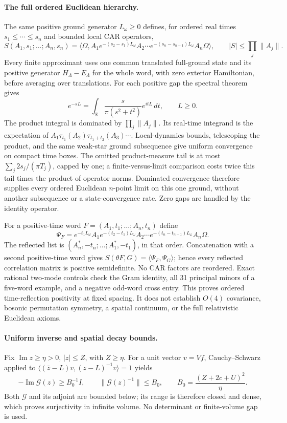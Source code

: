 \paragraph{The full ordered Euclidean hierarchy.}
The same positive ground generator $L_\omega\geq0$ defines, for ordered
real times $s_1\leq\cdots\leq s_n$ and bounded local CAR operators,
\[
 S(A_1,s_1;\ldots;A_n,s_n)
 =\langle\Omega,A_1e^{-(s_2-s_1)L_\omega}A_2\cdots
                   e^{-(s_n-s_{n-1})L_\omega}A_n\Omega\rangle,
 \qquad |S|\leq\prod_j\|A_j\|.
\]
Every finite approximant uses one common translated full-ground state
and its positive generator $H_\Lambda-E_\Lambda$ for the whole word,
with zero exterior Hamiltonian, before averaging over translations.
For each positive gap the spectral theorem gives
\[
 e^{-sL}=\int_{\mathbb R}\frac{s}{\pi(s^2+t^2)}e^{itL}\,dt,
 \qquad L\geq0.
\]
The product integral is dominated by $\prod_j\|A_j\|$.
Its real-time integrand is the expectation of
$A_1\tau_{t_1}(A_2)\tau_{t_1+t_2}(A_3)\cdots$.
Local-dynamics bounds, telescoping the product, and the same
weak-star ground subsequence give uniform convergence on compact time
boxes.  The omitted product-measure tail is at most
$\sum_j2s_j/(\pi T_j)$, capped by one; a finite-versus-limit comparison
costs twice this tail times the product of operator norms.  Dominated
convergence therefore supplies every ordered Euclidean $n$-point limit
on this one ground, without another subsequence or a state-convergence rate.
Zero gaps are handled by the identity operator.

For a positive-time word $F=(A_1,t_1;\ldots;A_n,t_n)$ define
\[
 \Psi_F=e^{-t_1L_\omega}A_1e^{-(t_2-t_1)L_\omega}A_2\cdots
                      e^{-(t_n-t_{n-1})L_\omega}A_n\Omega.
\]
The reflected list is
$(A_n^*,-t_n;\ldots;A_1^*,-t_1)$, in that order.
Concatenation with a second positive-time word gives
$S(\theta F,G)=\langle\Psi_F,\Psi_G\rangle$; hence every reflected
correlation matrix is positive semidefinite.  No CAR factors are
reordered.  Exact rational two-mode controls check the Gram identity,
all 31 principal minors of a five-word example, and a negative odd-word
cross entry.  This proves ordered time-reflection positivity at fixed
spacing.  It does not establish $O(4)$ covariance, bosonic permutation
symmetry, a spatial continuum, or the full relativistic Euclidean axioms.

\paragraph{Uniform inverse and spatial decay bounds.}
Fix $\operatorname{Im}z\geq\eta>0$, $|z|\leq Z$, with $Z\geq\eta$.
For a unit vector $v=Vf$, Cauchy--Schwarz applied to
$\langle(\bar z-L)v,(z-L)^{-1}v\rangle=1$ yields
\[
 -\operatorname{Im}\mathcal G(z)\geq B_0^{-1}I,
 \qquad
 \|\mathcal G(z)^{-1}\|\leq B_0,
 \qquad B_0=\frac{(Z+2c+U)^2}{\eta}.
\]
Both $\mathcal G$ and its adjoint are bounded below; its range is
therefore closed and dense, which proves surjectivity in infinite volume.
No determinant or finite-volume gap is used.


